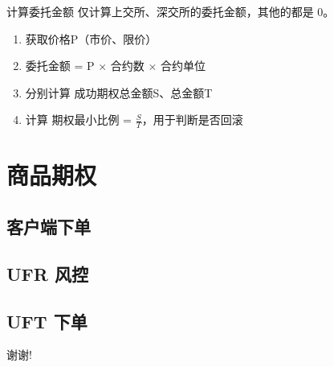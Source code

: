 \documentclass[12pt]{ctexbeamer}	%
\begin{document}
\begin{frame}{计算委托金额}
  仅计算上交所、深交所的委托金额，其他的都是 0。
  \begin{enumerate}
    \item 获取价格P（市价、限价）
    \item 委托金额 = P $\times$ 合约数 $\times$ 合约单位
    \item 分别计算 成功期权总金额S、总金额T
    \item 计算 期权最小比例 = $\frac{S}{T}$，用于判断是否回滚
  \end{enumerate}
\end{frame}


\section{商品期权}

\begin{frame}{}
\end{frame}


\subsection{客户端下单}

\begin{frame}{}
\end{frame}


\subsection{UFR 风控}

\begin{frame}{}
\end{frame}


\subsection{UFT 下单}

\begin{frame}{}
\end{frame}


\begin{frame}
\centerline{\Large 谢谢!}
\end{frame}
\end{document}
